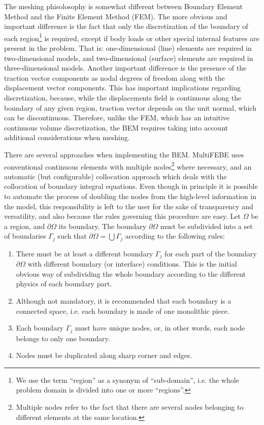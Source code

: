 \documentclass[A4]{article}
\begin{document}
The meshing phisolosophy is somewhat different between Boundary Element Method and the Finite Element Method (FEM). The more obvious and important difference is the fact that only the discretization of the boundary of each region\footnote{We use the term ``region'' as a synonym of ``sub-domain'', i.e. the whole problem domain is divided into one or more ``regions''.} is required, except if body loads or other special internal features are present in the problem. That is: one-dimensional (line) elements are required in two-dimensional models, and two-dimensional (surface) elements are required in three-dimensional models. Another important difference is the presence of the traction vector components as nodal degrees of freedom along with the displacement vector components. This has important implications regarding discretization, because, while the displacements field is continuous along the boundary of any given region, traction vector depends on the unit normal, which can be discontinuous. Therefore, unlike the FEM, which has an intuitive continuous volume discretization, the BEM requires taking into account additional considerations when meshing.

There are several approaches when implementing the BEM. MultiFEBE uses conventional continuous elements with multiple nodes\footnote{Multiple nodes refer to the fact that there are several nodes belonging to different elements at the same location.} where necessary, and an automatic (but configurable) collocation approach which deals with the collocation of boundary integral equations. Even though in principle it is possible to automate the process of doubling the nodes from the high-level information in the model, this responsibility is left to the user for the sake of transparency and versatility, and also because the rules governing this procedure are easy. Let $\Omega$ be a region, and $\partial\Omega$ its boundary. The boundary $\partial\Omega$ must be subdivided into a set of boundaries $\Gamma_j$ such that $\partial\Omega=\bigcup\Gamma_j$ according to the following rules:

\begin{enumerate}
    \item There must be at least a different boundary $\Gamma_j$ for each part of the boundary $\partial\Omega$ with different boundary (or interface) conditions. This is the initial obvious way of subdividing the whole boundary according to the different physics of each boundary part.
    \item Although not mandatory, it is recommended that each boundary is a connected space, i.e. each boundary is made of one monolithic piece.
    \item Each boundary $\Gamma_j$ must have unique nodes, or, in other words, each node belongs to only one boundary.
    \item Nodes must be duplicated along sharp corner and edges. 
\end{enumerate}
\end{document}
